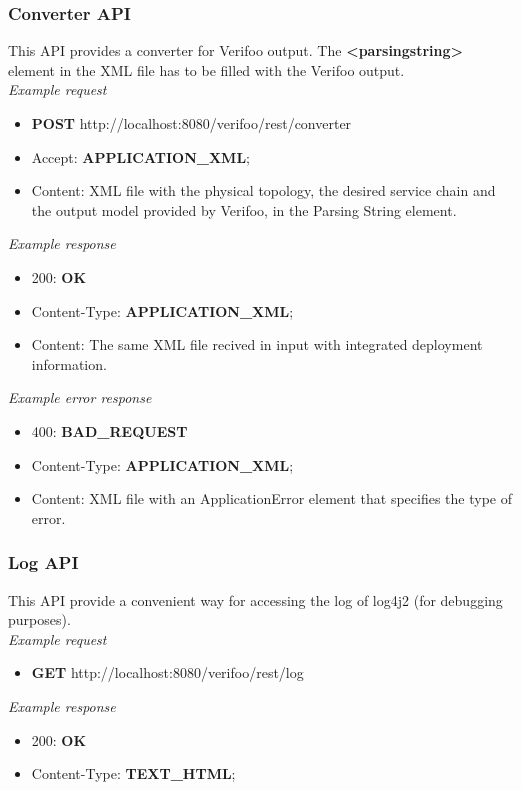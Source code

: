 \documentclass[a4paper,11pt]{article}
\begin{document}
\subsubsection*{Converter API}
This API provides a converter for Verifoo output.
The \textbf{<parsingstring>} element in the XML file has to be filled with the Verifoo output.\\
\textit{Example request}
\begin{itemize}
    \item \textbf{POST} http://localhost:8080/verifoo/rest/converter
    \item Accept: \textbf{APPLICATION\_XML};
    \item Content: XML file with the physical topology, the desired service chain and the output model provided by Verifoo, in the Parsing String element.
\end{itemize}
\textit{Example response}
\begin{itemize}
    \item 200: \textbf{OK}
    \item Content-Type: \textbf{APPLICATION\_XML};
    \item Content: The same XML file recived in input with integrated deployment information.
\end{itemize}
\textit{Example error response}
\begin{itemize}
    \item 400: \textbf{BAD\_REQUEST}
    \item Content-Type: \textbf{APPLICATION\_XML};
    \item Content: XML file with an ApplicationError element that specifies the type of error.
\end{itemize}
\subsubsection*{Log API}
This API provide a convenient way for accessing the log of log4j2 (for debugging purposes).\\
\textit{Example request}
\begin{itemize}
    \item \textbf{GET} http://localhost:8080/verifoo/rest/log
\end{itemize}
\textit{Example response}
\begin{itemize}
    \item 200: \textbf{OK}
    \item Content-Type: \textbf{TEXT\_HTML};
\end{itemize}
\end{document}

